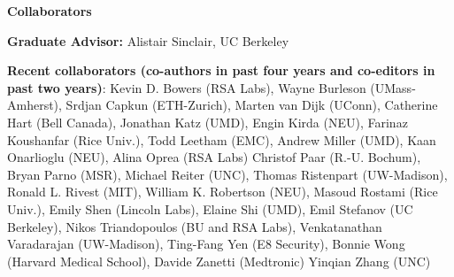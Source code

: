 \documentclass[11pt]{article}
\begin{document}
\vspace{1mm}
\noindent
{\Large {\bf Collaborators}}
\vspace{2mm}

\noindent
{\bf Graduate Advisor:} Alistair Sinclair, UC Berkeley

\bigskip
\noindent
{\bf Recent collaborators (co-authors in past four years and co-editors in past two years)}: Kevin D. Bowers (RSA Labs),
Wayne Burleson (UMass-Amherst),
Srdjan Capkun (ETH-Zurich),
Marten van Dijk (UConn),
Catherine Hart (Bell Canada),
Jonathan Katz (UMD),
Engin Kirda (NEU),
Farinaz Koushanfar (Rice Univ.),
Todd Leetham (EMC),
Andrew Miller (UMD),
Kaan Onarlioglu (NEU),
Alina Oprea (RSA Labs)
Christof Paar (R.-U. Bochum),
Bryan Parno (MSR),
Michael Reiter (UNC),
Thomas Ristenpart (UW-Madison),
Ronald L. Rivest (MIT),
William K. Robertson (NEU),
Masoud Rostami (Rice Univ.),
Emily Shen (Lincoln Labs),
Elaine Shi (UMD),
Emil Stefanov (UC Berkeley),
Nikos Triandopoulos (BU and RSA Labs),
Venkatanathan Varadarajan (UW-Madison),
Ting-Fang Yen (E8 Security),
Bonnie Wong (Harvard Medical School),
Davide Zanetti (Medtronic)
Yinqian Zhang (UNC)
\end{document}
